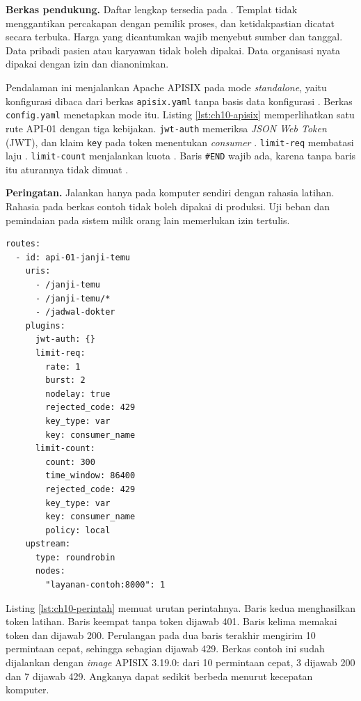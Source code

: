 \textbf{Berkas pendukung.} Daftar lengkap tersedia pada . Templat tidak menggantikan
percakapan dengan pemilik proses, dan ketidakpastian dicatat secara terbuka. Harga yang dicantumkan wajib menyebut
sumber dan tanggal. Data pribadi pasien atau karyawan tidak boleh dipakai. Data organisasi nyata dipakai dengan izin dan
dianonimkan.

\begin{pendalaman}[title={Pendalaman Teknis (opsional): Menjalankan Gateway Open Source di Docker}]
Pendalaman ini menjalankan Apache APISIX pada mode \textit{standalone}, yaitu konfigurasi dibaca dari berkas
\texttt{apisix.yaml} tanpa basis data konfigurasi \cite{c10-apisix-mode}. Berkas \texttt{config.yaml} menetapkan mode itu. Listing \ref{lst:ch10-apisix} memperlihatkan
satu rute API-01 dengan tiga kebijakan. \texttt{jwt-auth} memeriksa \textit{JSON Web Token} (JWT), dan klaim
\texttt{key} pada token menentukan \textit{consumer} \cite{c10-apisix-jwt}. \texttt{limit-req} membatasi laju
\cite{c10-apisix-limit-req}. \texttt{limit-count} menjalankan kuota \cite{c10-apisix-limit-count}. Baris \texttt{\#END}
wajib ada, karena tanpa baris itu aturannya tidak dimuat \cite{c10-apisix-mode}.

\textbf{Peringatan.} Jalankan hanya pada komputer sendiri dengan rahasia latihan. Rahasia pada berkas contoh tidak boleh
dipakai di produksi. Uji beban dan pemindaian pada sistem milik orang lain memerlukan izin tertulis.

\begin{lstlisting}[style=ch10yaml, caption={Rute API-01 dengan token, batas laju, dan kuota, tersedia di \berkas{sources/chapter10/gateway-lokal/apisix.yaml}}, label={lst:ch10-apisix}]
routes:
  - id: api-01-janji-temu
    uris:
      - /janji-temu
      - /janji-temu/*
      - /jadwal-dokter
    plugins:
      jwt-auth: {}
      limit-req:
        rate: 1
        burst: 2
        nodelay: true
        rejected_code: 429
        key_type: var
        key: consumer_name
      limit-count:
        count: 300
        time_window: 86400
        rejected_code: 429
        key_type: var
        key: consumer_name
        policy: local
    upstream:
      type: roundrobin
      nodes:
        "layanan-contoh:8000": 1
\end{lstlisting}

Listing \ref{lst:ch10-perintah} memuat urutan perintahnya. Baris kedua menghasilkan token latihan. Baris keempat tanpa
token dijawab 401. Baris kelima memakai token dan dijawab 200. Perulangan pada dua baris terakhir mengirim 10 permintaan
cepat, sehingga sebagian dijawab 429. Berkas contoh ini sudah dijalankan dengan \textit{image} APISIX 3.19.0: dari 10
permintaan cepat, 3 dijawab 200 dan 7 dijawab 429. Angkanya dapat sedikit berbeda menurut kecepatan komputer.


\end{pendalaman}
